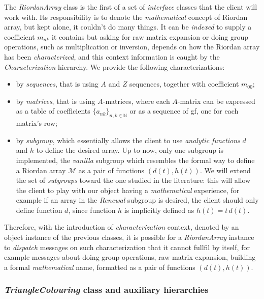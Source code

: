 The \emph{RiordanArray} class is the first of a set of \emph{interface} classes
that the client will work with.  Its responsibility is to denote the
\emph{mathematical} concept of Riordan array, but kept alone, it couldn't do
many things. It can be \emph{indexed} to supply a coefficient $m_{nk}$ it
contains but asking for raw matrix expansion or doing group operations, such as
multiplication or inversion, depends on how the Riordan array has been
\emph{characterized}, and this context information is caught by the
\emph{Characterization} hierarchy. We provide the following
characterizations: 
\begin{itemize}
    \item by \emph{sequences}, that is using $A$ and $Z$ sequences, together with
        coefficient $m_{00}$;
    \item by \emph{matrices}, that is using $A$-matrices, where each $A$-matrix can 
        be expressed as a table of coefficients $\lbrace a_{nk}\rbrace_{n,k\in\mathbb{N}}$ 
        or as a sequence of \ac{gf}, one for each matrix's row;
    \item by \emph{subgroup}, which essentially allows the client to use \emph{analytic
        functions} $d$ and $h$ to define the desired array. Up to now, only one
        subgroup is implemented, the \emph{vanilla} subgroup which resembles the
        formal way to define a Riordan array $\mathcal{M}$ as a pair of functions $(d(t),h(t))$.
        We will extend the set of \emph{subgroups} toward the one studied in the literature:
        this will allow the client to play with our object having a \emph{mathematical}
        experience, for example if an array in the \emph{Renewal} subgroup is desired,
        the client should only define function $d$, since function $h$ is implicitly
        defined as $h(t)=t\,d(t)$.
\end{itemize}

Therefore, with the introduction of \emph{characterization} context, denoted by
an object instance of the previous classes, it is possible for a
\emph{RiordanArray} instance to \emph{dispatch} messages on such
characterization that it cannot fullfil by itself, for example messages about
doing group operations, raw matrix expansion, building a formal
\emph{mathematical} name, formatted as a pair of functions $(d(t),h(t))$.

\subsubsection{\emph{TriangleColouring} class and auxiliary hierarchies}


